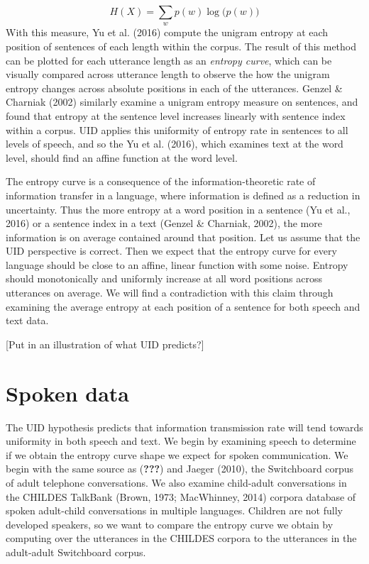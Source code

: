 \documentclass[10pt, letterpaper]{article}
\begin{document}
\[H(X) = \sum\limits_w p(w)\log\big(p(w)\big)\] With this measure, Yu et
al. (2016) compute the unigram entropy at each position of sentences of
each length within the corpus. The result of this method can be plotted
for each utterance length as an \emph{entropy curve}, which can be
visually compared across utterance length to observe the how the unigram
entropy changes across absolute positions in each of the utterances.
Genzel \& Charniak (2002) similarly examine a unigram entropy measure on
sentences, and found that entropy at the sentence level increases
linearly with sentence index within a corpus. UID applies this
uniformity of entropy rate in sentences to all levels of speech, and so
the Yu et al. (2016), which examines text at the word level, should find
an affine function at the word level.

The entropy curve is a consequence of the information-theoretic rate of
information transfer in a language, where information is defined as a
reduction in uncertainty. Thus the more entropy at a word position in a
sentence (Yu et al., 2016) or a sentence index in a text (Genzel \&
Charniak, 2002), the more information is on average contained around
that position. Let us assume that the UID perspective is correct. Then
we expect that the entropy curve for every language should be close to
an affine, linear function with some noise. Entropy should monotonically
and uniformly increase at all word positions across utterances on
average. We will find a contradiction with this claim through examining
the average entropy at each position of a sentence for both speech and
text data.

{[}Put in an illustration of what UID predicts?{]}

\hypertarget{spoken-data}{%
\section{Spoken data}\label{spoken-data}}

The UID hypothesis predicts that information transmission rate will tend
towards uniformity in both speech and text. We begin by examining speech
to determine if we obtain the entropy curve shape we expect for spoken
communication. We begin with the same source as ({\textbf{???}}) and
Jaeger (2010), the Switchboard corpus of adult telephone conversations.
We also examine child-adult conversations in the CHILDES TalkBank
(Brown, 1973; MacWhinney, 2014) corpora database of spoken adult-child
conversations in multiple languages. Children are not fully developed
speakers, so we want to compare the entropy curve we obtain by computing
over the utterances in the CHILDES corpora to the utterances in the
adult-adult Switchboard corpus.
\end{document}
